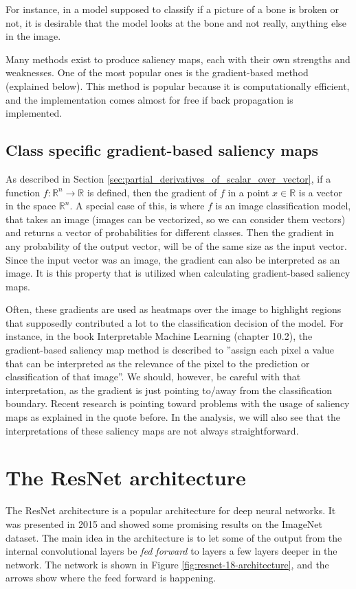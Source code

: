 For instance, in a model supposed to classify if a picture of a bone is broken or not,
it is desirable that the model looks at the bone and not really, anything else in the image.

Many methods exist to produce saliency maps, each with their own strengths and weaknesses.
One of the most popular ones is the gradient-based method (explained below).
This method is popular because it is computationally efficient,
and the implementation comes almost for free if back propagation is implemented.

\subsection{Class specific gradient-based saliency maps} \label{sec:gradiant_saliency_maps}
As described in Section \ref{sec:partial_derivatives_of_scalar_over_vector},
if a function $f: \mathbb{R}^n \rightarrow \mathbb{R}$ is defined,
then the gradient of $f$ in a point $x\in\mathbb{R}$ is a vector in the space $\mathbb{R}^n$.
A special case of this, is where $f$ is an image classification model, that takes
an image (images can be vectorized, so we can consider them vectors) and returns a vector of probabilities for
different classes.
Then the gradient in any probability of the output vector, will be of the same size as the input vector.
Since the input vector was an image, the gradient can also be interpreted as an image.
It is this property that is utilized when calculating gradient-based saliency maps.

Often, these gradients are used as heatmaps over the image to highlight regions that
supposedly contributed a lot to the classification decision of the model.
For instance, in the book Interpretable Machine Learning (chapter 10.2)\cite{interpretable-machine-learning}, the gradient-based
saliency map method is described to
''assign each pixel a value that can be interpreted as the relevance of the pixel to the prediction or classification of that image''.
We should, however, be careful with that interpretation, as the gradient is just pointing to/away from the classification boundary.
Recent research is pointing toward problems with the usage of saliency maps as explained in the quote before\cite{false-hope}.
In the analysis, we will also see that the interpretations of these saliency maps are not always straightforward.

\section{The ResNet architecture}
The ResNet architecture is a popular architecture for deep neural networks.
It was presented in 2015 and showed some promising results on the ImageNet dataset\cite{RESNET-paper}.
The main idea in the architecture is to let some of the output from the internal convolutional layers
be \textit{fed forward} to layers a few layers deeper in the network.
The network is shown in Figure \ref{fig:resnet-18-architecture},
and the arrows show where the feed forward is happening.

